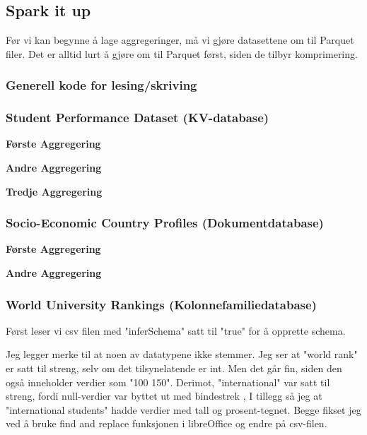 \subsection{Spark it up}
Før vi kan begynne å lage aggregeringer, må vi gjøre datasettene om til Parquet filer. Det er alltid lurt å gjøre om til Parquet først, siden de tilbyr komprimering.

\subsubsection{Generell kode for lesing/skriving}

\subsubsection{Student Performance Dataset (KV-database)}
\textbf{Første Aggregering}\\

\textbf{Andre Aggregering}\\

\textbf{Tredje Aggregering}\\

\subsubsection{Socio-Economic Country Profiles (Dokumentdatabase)}
\textbf{Første Aggregering}\\

\textbf{Andre Aggregering}\\

\subsubsection{World University Rankings (Kolonnefamiliedatabase)}

Først leser vi csv filen med "inferSchema" satt til "true" for å opprette schema.

Jeg legger merke til at noen av datatypene ikke stemmer. Jeg ser at "world rank" er satt til streng, selv om det tilsynelatende er int. Men det går fin, siden den også inneholder verdier som "100 150". Derimot, "international" var satt til streng, fordi null-verdier var byttet ut med bindestrek , I tillegg så jeg at "international students" hadde verdier med tall og prosent-tegnet. Begge fikset jeg ved å bruke find and replace funksjonen i libreOffice og endre på csv-filen.


